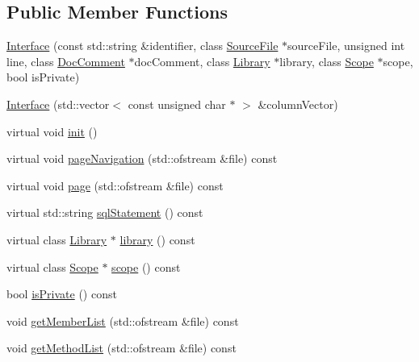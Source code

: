 \subsection*{Public Member Functions}
\begin{CompactItemize}
\item 
\hyperlink{classvjassdoc_1_1Interface_b6c3fb74c0fb4aa7af5cf6dcd7050197}{Interface} (const std::string \&identifier, class \hyperlink{classvjassdoc_1_1SourceFile}{SourceFile} $\ast$sourceFile, unsigned int line, class \hyperlink{classvjassdoc_1_1DocComment}{DocComment} $\ast$docComment, class \hyperlink{classvjassdoc_1_1Library}{Library} $\ast$library, class \hyperlink{classvjassdoc_1_1Scope}{Scope} $\ast$scope, bool isPrivate)
\item 
\hyperlink{classvjassdoc_1_1Interface_6f5c7df2965d2be79bb46d3c4453d862}{Interface} (std::vector$<$ const unsigned char $\ast$ $>$ \&columnVector)
\item 
virtual void \hyperlink{classvjassdoc_1_1Interface_e10d2a4a6acf44897145bf76675b9da1}{init} ()
\item 
virtual void \hyperlink{classvjassdoc_1_1Interface_f0acc07a23eb46eb9f065fb47d55f1a5}{pageNavigation} (std::ofstream \&file) const 
\item 
virtual void \hyperlink{classvjassdoc_1_1Interface_79ed4ee7fd055e3b53fdb9b14749fa0f}{page} (std::ofstream \&file) const 
\item 
virtual std::string \hyperlink{classvjassdoc_1_1Interface_93fbe7323df0502111e576c08376b726}{sqlStatement} () const 
\item 
virtual class \hyperlink{classvjassdoc_1_1Library}{Library} $\ast$ \hyperlink{classvjassdoc_1_1Interface_69ae9cd3e06f91fc2c33ebd6f1b425fe}{library} () const 
\item 
virtual class \hyperlink{classvjassdoc_1_1Scope}{Scope} $\ast$ \hyperlink{classvjassdoc_1_1Interface_407dbdb20eabf2e9f08bf7c459910335}{scope} () const 
\item 
bool \hyperlink{classvjassdoc_1_1Interface_edf12e5dcbcd2ab2afb07164d4ea6e64}{isPrivate} () const 
\item 
void \hyperlink{classvjassdoc_1_1Interface_ed8fce4aaef9f4fa5f3416f3adc02278}{getMemberList} (std::ofstream \&file) const 
\item 
void \hyperlink{classvjassdoc_1_1Interface_055d23bf3a4010668e3a656ea00c9f1e}{getMethodList} (std::ofstream \&file) const 
\end{CompactItemize}


